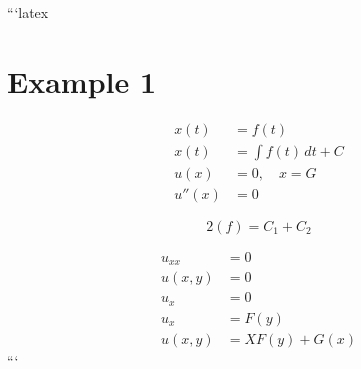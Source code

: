 ```latex
\section*{Example 1}

\begin{align}
    x(t) &= f(t) \\
    x(t) &= \int f(t) \, dt + C \\
    u(x) &= 0, \quad x = G \\
    u''(x) &= 0
\end{align}

\begin{equation}
    2(f) = C_1 + C_2
\end{equation}

\begin{align}
    u_{xx} &= 0 \\
    u(x, y) &= 0 \\
    u_x &= 0 \\
    u_x &= F(y) \\
    u(x, y) &= X F(y) + G(x)
\end{align}
```
